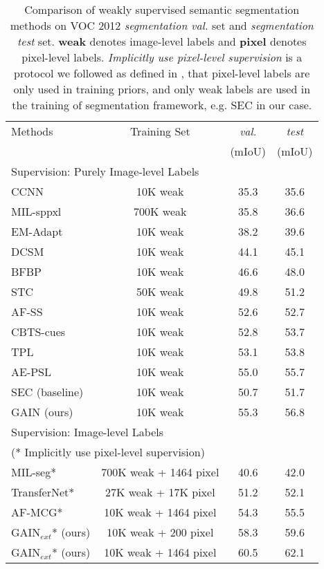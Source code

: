 \documentclass[10pt,twocolumn,letterpaper]{article}
\begin{document}
\setlength\tabcolsep{2pt}
 \begin{table}
 \small
 \begin{center}
 \begin{tabular}{lccc}
 \hline
 Methods & Training Set & \emph{val.}  &  \emph{test}\\
  & & (mIoU) & (mIoU) \\
 \hline\hline
 \multicolumn{3}{l}{Supervision: Purely Image-level Labels } \\
 CCNN \cite{pathak2015constrained} & 10K weak & 35.3 & 35.6\\
 MIL-sppxl \cite{pinheiro2015image} & 700K weak & 35.8 & 36.6\\
 EM-Adapt \cite{papandreou2015weakly} & 10K weak & 38.2 & 39.6\\
 DCSM \cite{shimoda2016distinct} & 10K weak & 44.1 & 45.1\\
 BFBP \cite{saleh2016built} & 10K weak & 46.6 & 48.0\\
 STC \cite{wei2017stc} & 50K weak & 49.8 & 51.2\\
 AF-SS \cite{qi2016augmented} & 10K weak & 52.6 & 52.7\\
 CBTS-cues \cite{roy2017combining} & 10K weak & 52.8 & 53.7\\
 TPL \cite{kim2017two} & 10K weak & 53.1 & 53.8\\
 AE-PSL \cite{wei2017object} & 10K weak & 55.0 & 55.7\\
 SEC \cite{kolesnikov2016seed} (baseline) & 10K weak & 50.7 & 51.7\\
 GAIN (ours) & 10K weak & 55.3 & 56.8\\
 \hline
 \multicolumn{3}{l}{Supervision: Image-level Labels } \\
 \multicolumn{3}{l}{(* Implicitly use pixel-level supervision)} \\
 MIL-seg* \cite{pinheiro2015image} & 700K weak + 1464 pixel & 40.6 & 42.0\\
 TransferNet* \cite{hong2016learning} & 27K weak + 17K pixel & 51.2 & 52.1\\
 AF-MCG* \cite{qi2016augmented} & 10K weak + 1464 pixel & 54.3 & 55.5\\
 GAIN$_{ext}$* (ours) & 10K weak + 200 pixel & 58.3 & 59.6\\
 GAIN$_{ext}$* (ours) & 10K weak + 1464 pixel & 60.5 & 62.1\\
 \hline
 \end{tabular}
 \end{center}
 \caption{Comparison of weakly supervised semantic segmentation methods on VOC 2012 \emph{segmentation val.} set and \emph{segmentation test} set. \textbf{weak} denotes image-level labels and \textbf{pixel} denotes pixel-level labels. \textit{Implicitly use pixel-level supervision} is a protocol we followed as defined in \cite{wei2017object}, that pixel-level labels are only used in training priors, and only weak labels are used in the training of segmentation framework, e.g. SEC \cite{kolesnikov2016seed} in our case.}
 \label{table:voc_val_test}
 \end{table}
\end{document}
